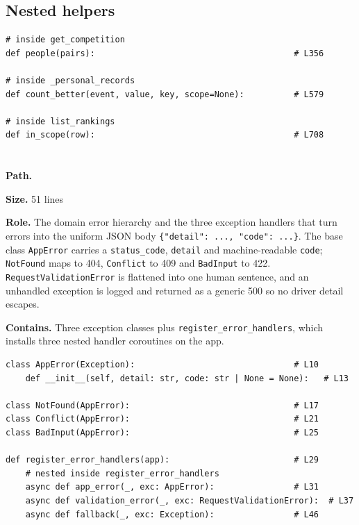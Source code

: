 \documentclass[11pt,a4paper]{article}
\newcommand{\filepath}[1]{\texttt{\detokenize{#1}}}
\newcommand{\role}[1]{\par\smallskip\noindent\textbf{Role.} #1\par}
\newcommand{\filesize}[1]{\par\smallskip\noindent\textbf{Size.} #1 lines\par}
\newcommand{\contents}[1]{\par\smallskip\noindent\textbf{Contains.} #1\par\smallskip}
\begin{document}
\subsection*{Nested helpers}
\begin{lstlisting}
# inside get_competition
def people(pairs):                                        # L356

# inside _personal_records
def count_better(event, value, key, scope=None):          # L579

# inside list_rankings
def in_scope(row):                                        # L708
\end{lstlisting}

\section{\filepath{src/errors.py}}

\noindent\textbf{Path.} \filepath{src/errors.py}
\filesize{51}
\role{The domain error hierarchy and the three exception handlers that turn
errors into the uniform JSON body \texttt{\{"detail": ..., "code": ...\}}. The
base class \texttt{AppError} carries a \texttt{status\_code},
\texttt{detail} and machine-readable \texttt{code}; \texttt{NotFound} maps to
404, \texttt{Conflict} to 409 and \texttt{BadInput} to 422.
\texttt{RequestValidationError} is flattened into one human sentence, and an
unhandled exception is logged and returned as a generic 500 so no driver
detail escapes.}
\contents{Three exception classes plus \texttt{register\_error\_handlers},
which installs three nested handler coroutines on the app.}

\begin{lstlisting}
class AppError(Exception):                                # L10
    def __init__(self, detail: str, code: str | None = None):   # L13

class NotFound(AppError):                                 # L17
class Conflict(AppError):                                 # L21
class BadInput(AppError):                                 # L25

def register_error_handlers(app):                         # L29
    # nested inside register_error_handlers
    async def app_error(_, exc: AppError):                # L31
    async def validation_error(_, exc: RequestValidationError):  # L37
    async def fallback(_, exc: Exception):                # L46
\end{lstlisting}
\end{document}
